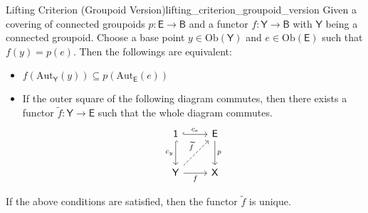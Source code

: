\documentclass{report}
\begin{document}
\begin{proposition}{Lifting Criterion (Groupoid Version)}{lifting_criterion_groupoid_version}
	Given a covering of connected groupoids $p:\mathsf{E} \rightarrow\mathsf{B} $ and a functor $f:\mathsf{Y} \rightarrow\mathsf{B}$ with $\mathsf{Y}$ being a connected groupoid. Choose a base point $y\in \mathrm{Ob}(\mathsf{Y})$ and $e\in \mathrm{Ob}(\mathsf{E})$ such that $f(y)=p(e)$.
	Then the followings are equivalent:
	\begin{itemize}
		\item $f\left(\mathrm{Aut}_\mathsf{Y}(y)\right)\subseteq p\left(\mathrm{Aut}_\mathsf{E}(e)\right)$
		\item If the outer square of the following diagram commutes, then there exists a functor $\widetilde{f}:\mathsf{Y}\to \mathsf{E}$ such that the whole diagram commutes.
		      \[
			      \begin{tikzcd}[ampersand replacement=\&]
				      \mathsf{1} \arrow[r, "c_e", hook] \arrow[d, "c_y"', hook]                      \& \mathsf{E} \arrow[d, "p"] \\ [+7pt]
				      \mathsf{Y} \arrow[r, "f"'] \arrow[ru, "\widetilde{f}", dashed] \&\mathsf{X}
			      \end{tikzcd}
		      \]
	\end{itemize}
	If the above conditions are satisfied, then the functor $\widetilde{f}$ is unique.
\end{proposition}
\end{document}

